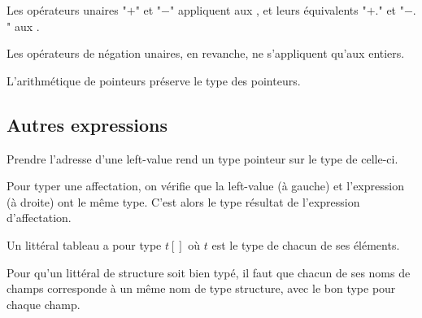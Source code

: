 
Les opérateurs unaires "$+$" et "$-$" appliquent aux \tInt, et leurs équivalents
"$+.$" et "$-.$" aux \tFloat.


Les opérateurs de négation unaires, en revanche, ne s'appliquent qu'aux
entiers.

\begin{mathpar}
\end{mathpar}

L'arithmétique de pointeurs préserve le type des pointeurs.

\begin{mathpar}
\end{mathpar}

\subsection*{Autres expressions}

Prendre l'adresse d'une left-value rend un type pointeur sur le type de
celle-ci.

\begin{mathpar}
\end{mathpar}

Pour typer une affectation, on vérifie que la left-value (à gauche) et
l'expression (à droite) ont le même type. C'est alors le type résultat de
l'expression d'affectation.

\begin{mathpar}
\end{mathpar}

Un littéral tableau a pour type $t[]$ où $t$ est le type de chacun de ses
éléments.

\begin{mathpar}
\end{mathpar}

Pour qu'un littéral de structure soit bien typé, il faut que chacun de ses noms
de champs corresponde à un même nom de type structure, avec le bon type pour
chaque champ.

\begin{mathpar}
\end{mathpar}

